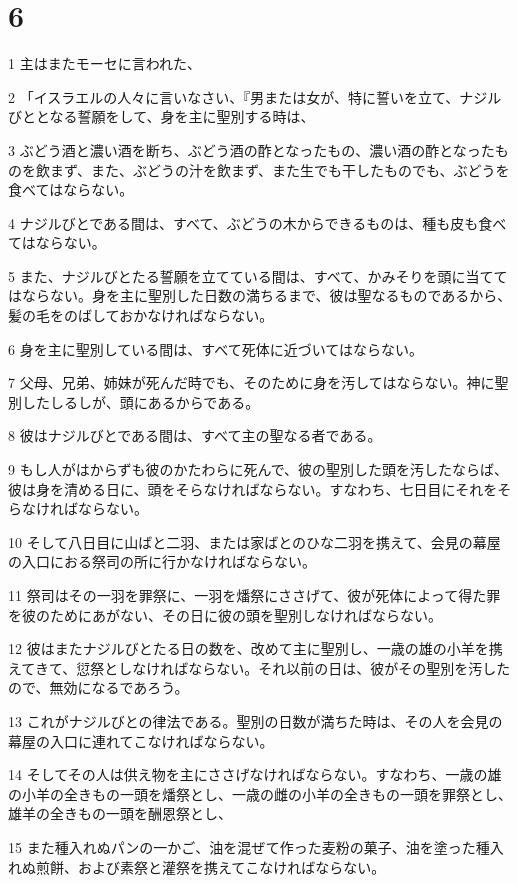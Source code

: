 \chapter{6}

\par 1 主はまたモーセに言われた、
\par 2 「イスラエルの人々に言いなさい、『男または女が、特に誓いを立て、ナジルびととなる誓願をして、身を主に聖別する時は、
\par 3 ぶどう酒と濃い酒を断ち、ぶどう酒の酢となったもの、濃い酒の酢となったものを飲まず、また、ぶどうの汁を飲まず、また生でも干したものでも、ぶどうを食べてはならない。
\par 4 ナジルびとである間は、すべて、ぶどうの木からできるものは、種も皮も食べてはならない。
\par 5 また、ナジルびとたる誓願を立てている間は、すべて、かみそりを頭に当ててはならない。身を主に聖別した日数の満ちるまで、彼は聖なるものであるから、髪の毛をのばしておかなければならない。
\par 6 身を主に聖別している間は、すべて死体に近づいてはならない。
\par 7 父母、兄弟、姉妹が死んだ時でも、そのために身を汚してはならない。神に聖別したしるしが、頭にあるからである。
\par 8 彼はナジルびとである間は、すべて主の聖なる者である。
\par 9 もし人がはからずも彼のかたわらに死んで、彼の聖別した頭を汚したならば、彼は身を清める日に、頭をそらなければならない。すなわち、七日目にそれをそらなければならない。
\par 10 そして八日目に山ばと二羽、または家ばとのひな二羽を携えて、会見の幕屋の入口におる祭司の所に行かなければならない。
\par 11 祭司はその一羽を罪祭に、一羽を燔祭にささげて、彼が死体によって得た罪を彼のためにあがない、その日に彼の頭を聖別しなければならない。
\par 12 彼はまたナジルびとたる日の数を、改めて主に聖別し、一歳の雄の小羊を携えてきて、愆祭としなければならない。それ以前の日は、彼がその聖別を汚したので、無効になるであろう。
\par 13 これがナジルびとの律法である。聖別の日数が満ちた時は、その人を会見の幕屋の入口に連れてこなければならない。
\par 14 そしてその人は供え物を主にささげなければならない。すなわち、一歳の雄の小羊の全きもの一頭を燔祭とし、一歳の雌の小羊の全きもの一頭を罪祭とし、雄羊の全きもの一頭を酬恩祭とし、
\par 15 また種入れぬパンの一かご、油を混ぜて作った麦粉の菓子、油を塗った種入れぬ煎餅、および素祭と灌祭を携えてこなければならない。
